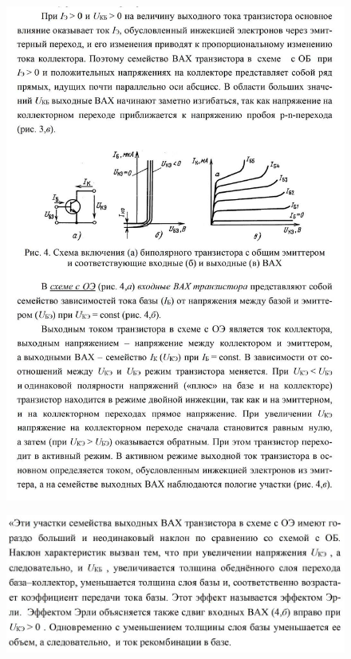 \documentclass[a4paper,14pt]{article}
\begin{document}
\begin{figure}[H]
	\centering
	\includegraphics[width=\linewidth]{images/theory_6}
	\caption*{}
\end{figure}

\begin{figure}[H]
	\centering
	\includegraphics[width=\linewidth]{images/theory_7}
	\caption*{}
\end{figure}
\end{document}

